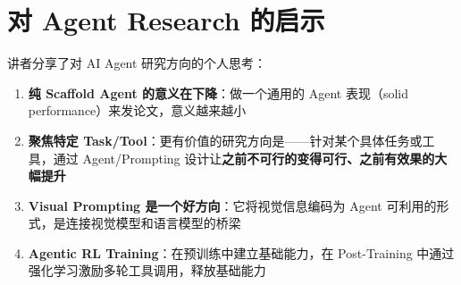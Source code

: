 \section{对 Agent Research 的启示}

讲者分享了对 AI Agent 研究方向的个人思考：

\begin{enumerate}
    \item \textbf{纯 Scaffold Agent 的意义在下降}：做一个通用的 Agent 表现（solid performance）来发论文，意义越来越小
    \item \textbf{聚焦特定 Task/Tool}：更有价值的研究方向是——针对某个具体任务或工具，通过 Agent/Prompting 设计让\textbf{之前不可行的变得可行、之前有效果的大幅提升}
    \item \textbf{Visual Prompting 是一个好方向}：它将视觉信息编码为 Agent 可利用的形式，是连接视觉模型和语言模型的桥梁
    \item \textbf{Agentic RL Training}：在预训练中建立基础能力，在 Post-Training 中通过强化学习激励多轮工具调用，释放基础能力
\end{enumerate}



